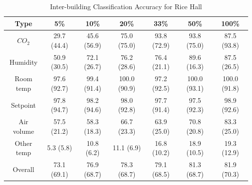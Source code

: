 \begin{table}[ht!]
\centering %
\begin{tabular}{c | c | c | c | c | c | c}%
\hline %
Type & 5\% & 10\% & 20\% & 33\% & 50\% & 100\% \\ %
\hline\hline %
$CO_{2}$ & 29.7 (44.4) & 45.6 (56.9) & 75.0 (75.0) & 93.8 (72.9) & 93.8 (75.0) & 87.5 (93.8)\\ \hline
Humidity & 50.9 (30.5) & 72.1 (26.7) & 76.2 (28.6) & 76.4 (21.1) & 89.6 (16.3) & 87.5 (26.5)\\ \hline
Room temp & 97.6 (92.7) & 99.4 (91.4) & 100.0 (90.9) & 97.2 (92.5) & 100.0 (93.1) & 100.0 (91.8)\\ \hline
Setpoint & 97.8 (94.7) & 98.2 (94.6) & 98.0 (92.8) & 97.7 (91.4) & 97.5 (92.3) & 98.9 (92.6)\\ \hline
Air volume & 57.5 (21.2) & 58.3 (18.3) & 66.7 (23.3) & 63.9 (25.0) & 70.8 (20.8) & 83.3 (25.0)\\ \hline
Other temp & 5.3 (5.8) & 10.8 (6.2) & 11.1 (6.9) & 16.8 (10.2) & 18.9 (10.5) & 19.3 (12.9)\\ \hline
Overall & 73.1 (69.1) & 76.9 (68.7) & 78.3 (68.7) & 79.1 (68.5) & 81.3 (68.7) & 81.9 (70.3)\\ \hline
\end{tabular}
\caption{Inter-building Classification Accuracy for Rice Hall}
\label{table:rice_x} %
\end{table}


